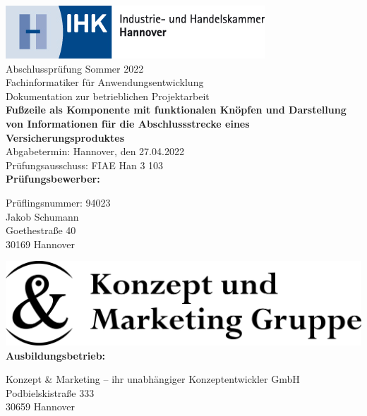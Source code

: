 \thispagestyle{empty}


\begin{center}
	\includegraphics[scale=0.9]{bilder/logo_ihkdata}\\[2ex]
	\Large{Abschlussprüfung Sommer 2022}\\[3ex]
	
	\Large{Fachinformatiker für Anwendungsentwicklung}\\
	\LARGE{Dokumentation zur betrieblichen Projektarbeit}\\[4ex]
	
	\huge{\textbf{Fußzeile als Komponente mit funktionalen Knöpfen und Darstellung von Informationen für die Abschlussstrecke eines Versicherungsproduktes}}\\[1ex]
	
	\normalsize
	Abgabetermin: Hannover, den 27.04.2022\\
	Prüfungsausschuss: FIAE Han 3 103\\[3em]
	
	\textbf{Prüfungsbewerber:}\\
	\begin{onehalfspace}
	Prüflingsnummer: 94023\\
	Jakob Schumann\\
	Goethestraße 40\\
	30169 Hannover\\[5ex]
	\end{onehalfspace}
	 
	\includegraphics[scale=0.3] {bilder/k&m.png}\\[1ex]

	\textbf{Ausbildungsbetrieb:}\\
	\begin{onehalfspace}
	Konzept \& Marketing – ihr unabhängiger Konzeptentwickler GmbH\\
	Podbielskistraße 333\\
	30659 Hannover\\[5em]
	\end{onehalfspace}
\end{center}
\newpage


